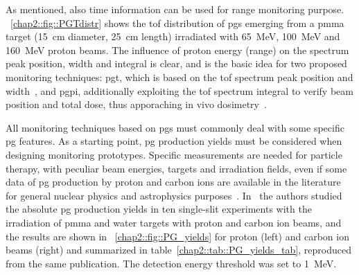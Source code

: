 As mentioned, also time information can be used for range monitoring purpose.  \figurename~\ref{chap2::fig::PGTdistr} shows the \gls{tof} distribution of \glspl{pg} emerging from a \gls{pmma} target (15~cm diameter, 25~cm length) irradiated with 65~MeV, 100~MeV and 160~MeV proton beams. The influence of proton energy (range) on the spectrum peak position, width and integral is clear, and is the basic idea for two proposed monitoring techniques: \gls{pgt}, which is based on the \gls{tof} spectrum peak position and width~\parencite{Golnik2014}, and \gls{pgpi}, additionally exploiting the \gls{tof} spectrum integral to verify beam position and total dose, thus apporaching in vivo dosimetry~\parencite{Krimmer2017b}. 

All monitoring techniques based on \glspl{pg} must commonly deal with some specific \gls{pg} features. As a starting point, \gls{pg} production yields must be considered when designing monitoring prototypes. 
Specific measurements are needed for particle therapy, with peculiar beam energies, targets and irradiation fields, even if some data of \gls{pg} production by proton and carbon ions are available in the literature for general nuclear physics and astrophysics purposes~\parencite{Dyer1981, Kiener1998}.
In~\cite{Pinto2015} the authors studied the absolute \gls{pg} production yields in ten single-slit experiments with the irradiation of \gls{pmma} and water targets with proton and carbon ion beams, and the results are shown in \figurename~\ref{chap2::fig::PG_yields} for proton (left) and carbon ion beams (right) and summarized in table~\ref{chap2::tab::PG_yields_tab}, reproduced from the same publication. The detection energy threshold was set to 1~MeV.

